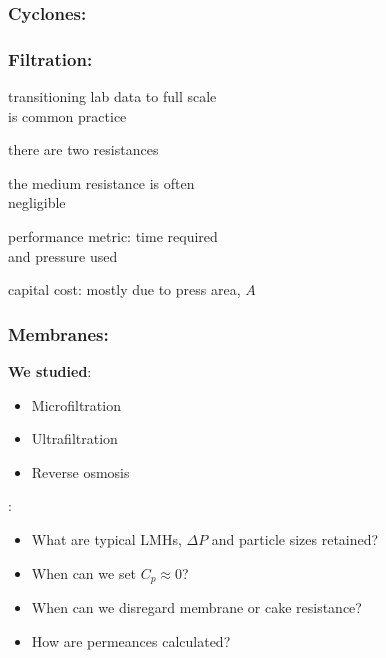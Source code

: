 {
\begin{frame}\frametitle{Cyclones: {}}
\end{frame}}

{
\begin{frame}\frametitle{Filtration: {}}
	\begin{itemize}
		{\color{myGreen}
		\item	transitioning lab data to full scale\\ is common practice
		\item	there are two resistances
		\item	the medium resistance is often\\ negligible
		\item	performance metric: time required\\ and pressure used
		\item	capital cost: mostly due to press area, $A$
		}
	\end{itemize}
\end{frame}}

{
\begin{frame}\frametitle{Membranes: {}}
	\textbf{We studied}:
	\begin{itemize}
		\item	Microfiltration
		\item	Ultrafiltration
		\item	Reverse osmosis
	\end{itemize}
	
	\vspace{3cm}
	\emph{{\color{myGreen}{Some things to consider}}}:
	\begin{itemize}
		\item	What are typical LMHs, $\Delta P$ and particle sizes retained?
		\item	When can we set $C_p \approx 0$?
		\item	When can we disregard membrane or cake resistance?
		\item	How are permeances calculated?
	\end{itemize}
\end{frame}}

